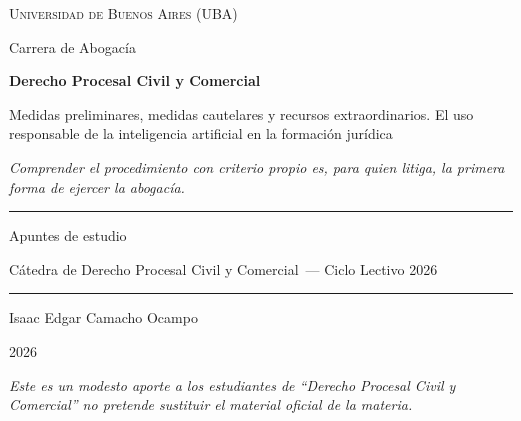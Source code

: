 \documentclass[12pt,oneside]{book}
\newcommand{\universidad}{Universidad de Buenos Aires (UBA)}
\newcommand{\carrera}{Carrera de Abogacía}
\newcommand{\materia}{Derecho Procesal Civil y Comercial}
\newcommand{\catedra}{Cátedra de Derecho Procesal Civil y Comercial}
\newcommand{\cicloLectivo}{Ciclo Lectivo 2026}
\newcommand{\titulo}{Medidas preliminares, medidas cautelares y recursos extraordinarios. El uso responsable de la inteligencia artificial en la formación jurídica}
\newcommand{\autor}{Isaac Edgar Camacho Ocampo}
\newcommand{\anio}{2026}
\begin{document}
\begin{titlepage}
\thispagestyle{empty}

\begin{center}

\vspace*{1cm}

{\large \textsc{\universidad}}

\vspace{0.2cm}

{\large \carrera}

\vspace{3cm}

{\Huge \textbf{\materia}}

\vspace{1cm}

{\LARGE \titulo}

\vspace{0.8cm}

\textit{Comprender el procedimiento con criterio propio es, para quien litiga, la primera forma de ejercer la abogacía.}

\vspace{1.2cm}

\rule{0.70\textwidth}{0.5pt}

\vspace{0.5cm}

{\large Apuntes de estudio}

\vspace{0.3cm}

{\normalsize \catedra\ --- \cicloLectivo}

\vspace{0.5cm}

\rule{0.70\textwidth}{0.5pt}

\vfill

{\large \autor}

\vspace{0.3cm}

{\large \anio}

\end{center}

\vfill

\begin{flushleft}
\textit{Este es un modesto aporte a los estudiantes de ``Derecho Procesal Civil y Comercial'' no pretende sustituir el material oficial de la materia.}
\end{flushleft}

\end{titlepage}
\end{document}
